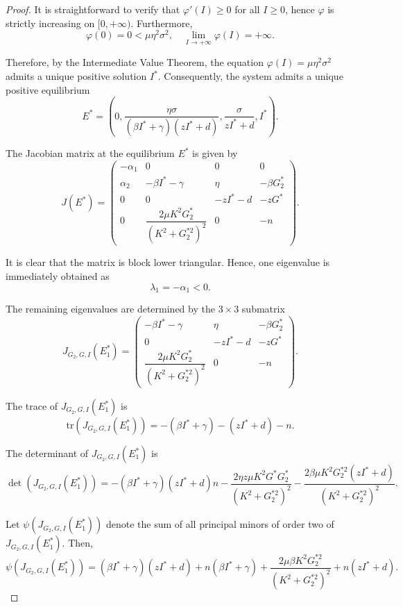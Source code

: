 \documentclass[a4paper,fleqn]{cas-sc}
\numberwithin{equation}{section}
\numberwithin{equation}{section}
\newcommand{\1}{\boldsymbol{1}}
\newcommand{\0}{\boldsymbol{0}}
\begin{document}
\begin{proof}
It is straightforward to verify that \(\varphi'(I) \geq 0\) for all \(I \geq 0\), hence \(\varphi\) is strictly increasing on \([0,+\infty)\). Furthermore,
\[
\varphi(0)=0 < \mu\eta^2\sigma^2, \quad \lim_{I\to+\infty}\varphi(I)=+\infty.
\]

Therefore, by the Intermediate Value Theorem, the equation \(\varphi(I)=\mu\eta^2\sigma^2\) admits a unique positive solution \(I^*\). Consequently, the system admits a unique positive equilibrium
\[
E^* = \left(0, \dfrac{\eta\sigma}{(\beta I^* +\gamma)(zI^*+d)}, \dfrac{\sigma}{zI^*+d}, I^*\right).
\]

The Jacobian matrix at the equilibrium $E^*$ is given by
\[
J(E^*) =
\begin{pmatrix}
-\alpha_1 & 0 & 0 & 0 \\[6pt]
\alpha_2 & -\beta I^* - \gamma & \eta & -\beta G_2^* \\[6pt]
0 & 0 & -zI^* - d & -zG^* \\[6pt]
0 & \dfrac{2\mu K^2 G_2^*}{\left(K^2 + G_2^{*2}\right)^2} & 0 & -n
\end{pmatrix}.
\]

It is clear that the matrix is block lower triangular. Hence, one eigenvalue is immediately obtained as
\[
\lambda_1 = -\alpha_1 < 0.
\]

The remaining eigenvalues are determined by the $3 \times 3$ submatrix
\[
J_{G_2,G,I}(E_1^*) =
\begin{pmatrix}
-\beta I^* - \gamma & \eta & -\beta G_2^* \\[6pt]
0 & -zI^* - d & -zG^* \\[6pt]
\dfrac{2\mu K^2 G_2^*}{\left(K^2 + G_2^{*2}\right)^2} & 0 & -n
\end{pmatrix}.
\]

The trace of $J_{G_2,G,I}(E_1^*)$ is
\[
\mathrm{tr}(J_{G_2,G,I}(E_1^*))
= -(\beta I^* + \gamma) - (zI^* + d) - n.
\]

The determinant of $J_{G_2,G,I}(E_1^*)$ is 
\[
\det(J_{G_2,G,I}(E_1^*))
= -
(\beta I^* + \gamma)(zI^* + d)n - \frac{2\eta z \mu K^2 G^* G_2^*}{(K^2 + G_2^{*2})^2} - \frac{2\beta \mu K^2 G_2^{*2} (zI^* + d)}{(K^2 + G_2^{*2})^2}.
\]

Let $\psi(J_{G_2,G,I}(E_1^*))$ denote the sum of all principal minors of order two of $J_{G_2,G,I}(E_1^*)$. Then,
\[
\psi(J_{G_2,G,I}(E_1^*)) = (\beta I^* + \gamma)(zI^* + d) + n(\beta I^* + \gamma)
+ \frac{2\mu \beta K^2 G_2^{*2}}{(K^2 + G_2^{*2})^2} + n(zI^* + d).
\]


\end{proof}
\end{document}
